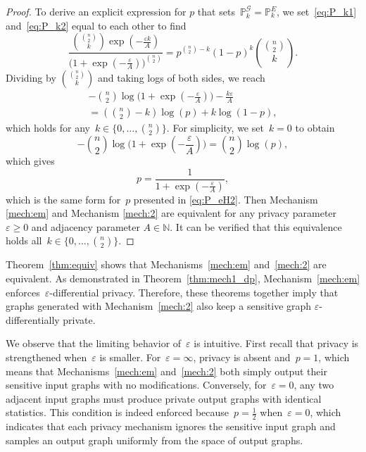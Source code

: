 \documentclass[conference]{ieeeconf}
\newcommand{\Prob}{\mathbb{P}}
\begin{document}
\begin{proof}
    To derive an explicit expression for $p$ that sets~$\Prob_k^\mathcal{G}=\Prob_k^E$,
    we set~\eqref{eq:P_k1} and~\eqref{eq:P_k2} equal to each other to find
    \begin{equation}
        \frac{{\binom{\binom{n}{2}}{k}} \exp(- \frac{\varepsilon k}{A})}{\biggl(1+\exp(-\frac{\varepsilon}{A})\biggr)^{\binom{n}{2}}} = p^{{\binom{n}{2}}-k} (1-p)^k {\binom{\binom{n}{2}}{k}}.
    \end{equation}
    Dividing by ${\binom{\binom{n}{2}}{k}}$ and taking logs of both sides, we reach
    \begin{multline}
        -{\binom{n}{2}} \log\biggl(1+\exp\left(-\frac{\varepsilon}{A}\right) \biggr)-\frac{k\varepsilon}{A} \\
        = \left({\binom{n}{2}}-k\right) \log(p) + k\log(1-p), 
    \end{multline}
    which holds for any~$k \in \{0, \ldots, \binom{n}{2}\}$. For simplicity, we set~$k=0$ to obtain
    \begin{equation}
        -{\binom{n}{2}}\log\biggl(1+\exp\left(-\frac{\varepsilon}{A}\right)\biggr) =  {\binom{n}{2}}\log(p),
    \end{equation}
    which gives
    \begin{equation}
        p = \frac{1}{1+\exp(-\frac{\varepsilon}{A})},
    \end{equation}
    which is the same form for~$p$ presented in \eqref{eq:P_eH2}. Then Mechanism \ref{mech:em} and Mechanism \ref{mech:2} are equivalent for any privacy parameter $\varepsilon \ge 0$ and adjacency parameter $A\in \mathbb{N}$. 
    It can be verified that this equivalence holds all~$k \in \{0, \ldots, \binom{n}{2}\}$.
\end{proof}

Theorem~\ref{thm:equiv} shows that Mechanisms~\ref{mech:em} and~\ref{mech:2} are equivalent. As demonstrated in Theorem~\ref{thm:mech1_dp}, Mechanism~\ref{mech:em} enforces~$\varepsilon$-differential privacy. 
Therefore, these theorems together imply that graphs generated with Mechanism~\ref{mech:2} also keep
a sensitive graph $\varepsilon$-differentially private.

We observe that the limiting behavior of~$\varepsilon$ is intuitive. 
First recall that privacy is strengthened when~$\varepsilon$ is smaller. 
For~$\varepsilon = \infty$, privacy is absent and~$p=1$, 
which means that Mechanisms~\ref{mech:em}
and~\ref{mech:2} both simply output their sensitive input graphs with no modifications. 
Conversely, for~$\varepsilon = 0$, any two adjacent input graphs must produce private output
graphs with identical statistics. This condition is indeed enforced because~$p = \frac{1}{2}$
when~$\varepsilon = 0$, which indicates that each privacy mechanism ignores the sensitive
input graph and samples an output graph uniformly from the space of output graphs. 
\end{document}
